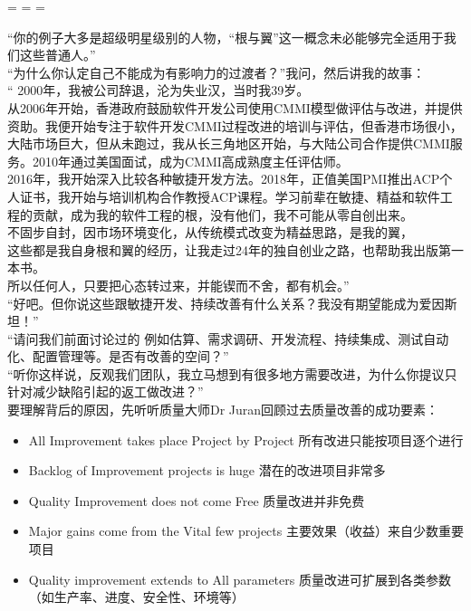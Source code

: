 \begin{description}
\tightlist
\item[]
= = =
\end{description}

``你的例子大多是超级明星级别的人物，``根与翼''这一概念未必能够完全适用于我们这些普通人。''\\
``为什么你认定自己不能成为有影响力的过渡者？''我问，然后讲我的故事：\\
`` 2000年，我被公司辞退，沦为失业汉，当时我39岁。\\
从2006年开始，香港政府鼓励软件开发公司使用CMMI模型做评估与改进，并提供资助。我便开始专注于软件开发CMMI过程改进的培训与评估，但香港市场很小，大陆市场巨大，但从未跑过，我从长三角地区开始，与大陆公司合作提供CMMI服务。2010年通过美国面试，成为CMMI高成熟度主任评估师。\\
2016年，我开始深入比较各种敏捷开发方法。2018年，正值美国PMI推出ACP个人证书，我开始与培训机构合作教授ACP课程。学习前辈在敏捷、精益和软件工程的贡献，成为我的软件工程的根，没有他们，我不可能从零自创出来。\\
不固步自封，因市场环境变化，从传统模式改变为精益思路，是我的翼，\\
这些都是我自身根和翼的经历，让我走过24年的独自创业之路，也帮助我出版第一本书。\\
所以任何人，只要把心态转过来，并能锲而不舍，都有机会。''\\
``好吧。但你说这些跟敏捷开发、持续改善有什么关系？我没有期望能成为爱因斯坦！''\\
``请问我们前面讨论过的
例如估算、需求调研、开发流程、持续集成、测试自动化、配置管理等。是否有改善的空间？''\\
``听你这样说，反观我们团队，我立马想到有很多地方需要改进，为什么你提议只针对减少缺陷引起的返工做改进？''\\
要理解背后的原因，先听听质量大师Dr Juran回顾过去质量改善的成功要素：

\begin{itemize}
\tightlist
\item
  All Improvement takes place Project by Project
  所有改进只能按项目逐个进行
\item
  Backlog of Improvement projects is huge 潜在的改进项目非常多
\item
  Quality Improvement does not come Free 质量改进并非免费
\item
  Major gains come from the Vital few projects
  主要效果（收益）来自少数重要项目
\item
  Quality improvement extends to All parameters
  质量改进可扩展到各类参数（如生产率、进度、安全性、环境等）
\end{itemize}

